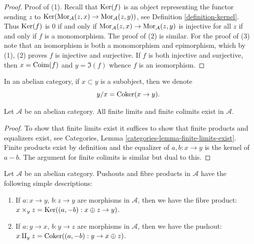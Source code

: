 \begin{proof}
Proof of (1). Recall that $\mathop{\mathrm{Ker}}(f)$ is an object representing the
functor sending $z$ to
$\mathop{\mathrm{Ker}}(\mathop{\mathrm{Mor}}\nolimits_\mathcal{A}(z, x) \to \mathop{\mathrm{Mor}}\nolimits_\mathcal{A}(z, y))$, see
Definition \ref{definition-kernel}.
Thus $\mathop{\mathrm{Ker}}(f)$ is $0$ if and only if
$\mathop{\mathrm{Mor}}\nolimits_\mathcal{A}(z, x) \to \mathop{\mathrm{Mor}}\nolimits_\mathcal{A}(z, y)$
is injective for all $z$ if and only if $f$ is a monomorphism.
The proof of (2) is similar.
For the proof of (3) note that an isomorphism is both a monomorphism
and epimorphism, which by (1), (2) proves $f$ is injective
and surjective. If $f$ is both injective and surjective, then
$x = \mathop{\mathrm{Coim}}(f)$ and $y = \Im(f)$ whence $f$ is an isomorphism.
\end{proof}

\noindent
In an abelian category, if $x \subset y$ is a subobject,
then we denote
$$
y/x = \mathop{\mathrm{Coker}}(x \to y).
$$

\begin{lemma}
\label{lemma-colimit-abelian-category}
Let $\mathcal{A}$ be an abelian category.
All finite limits and finite colimits exist in $\mathcal{A}$.
\end{lemma}

\begin{proof}
To show that finite limits exist it suffices to show
that finite products and equalizers exist, see
Categories, Lemma \ref{categories-lemma-finite-limits-exist}.
Finite products exist
by definition and the equalizer of $a, b : x \to y$ is
the kernel of $a - b$. The argument for finite colimits
is similar but dual to this.
\end{proof}

\begin{example}
\label{example-fibre-product-pushouts}
Let $\mathcal{A}$ be an abelian category.
Pushouts and fibre products in $\mathcal{A}$ have the following
simple descriptions:
\begin{enumerate}
\item If $a : x \to y$, $b : z \to y$ are morphisms in $\mathcal{A}$, then
we have the fibre product:
$x \times_y z = \mathop{\mathrm{Ker}}((a, -b) : x \oplus z \to y)$.
\item If $a : y \to x$, $b : y \to z$ are morphisms in $\mathcal{A}$, then
we have the pushout:
$x \amalg_y z = \mathop{\mathrm{Coker}}((a, -b) : y \to x \oplus z)$.
\end{enumerate}
\end{example}

